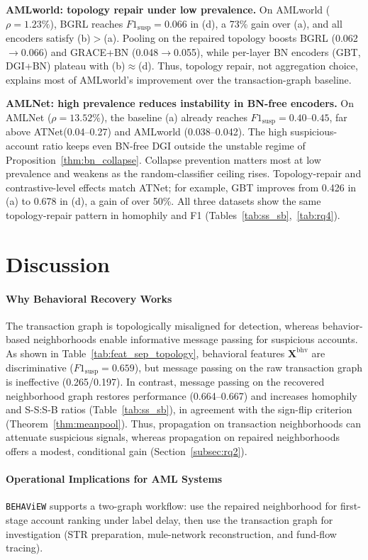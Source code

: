 \documentclass[sigconf,natbib=true,anonymous=true]{acmart}
\theoremstyle{definition}
\newcommand{\method}{\texttt{BEHAViEW}\xspace}
\newcommand{\hofinet}{ATNet\xspace} %
\begin{document}
\textbf{AMLworld: topology repair under low prevalence.} On AMLworld ($\rho{=}1.23\%$), BGRL reaches $F1_{\text{susp}}=0.066$ in (d), a 73\% gain over (a), and all encoders satisfy (b)$>$(a). Pooling on the repaired topology boosts BGRL (0.062$\to$0.066) and GRACE+BN (0.048$\to$0.055), while per-layer BN encoders (GBT, DGI+BN) plateau with (b)$\approx$(d). Thus, topology repair, not aggregation choice, explains most of AMLworld’s improvement over the transaction-graph baseline.

\textbf{AMLNet: high prevalence reduces instability in BN-free encoders.} On AMLNet ($\rho{=}13.52\%$), the baseline (a) already reaches $F1_{\text{susp}}=0.40$--$0.45$, far above \hofinet (0.04--0.27) and AMLworld (0.038--0.042). The high suspicious-account ratio keeps even BN-free DGI outside the unstable regime of Proposition~\ref{thm:bn_collapse}. Collapse prevention matters most at low prevalence and weakens as the random-classifier ceiling rises. Topology-repair and contrastive-level effects match \hofinet; for example, GBT improves from 0.426 in (a) to 0.678 in (d), a gain of over 50\%. All three datasets show the same topology-repair pattern in homophily and F1 (Tables~\ref{tab:ss_sb},~\ref{tab:rq4}).

\section{Discussion}
\paragraph{\textbf{Why Behavioral Recovery Works}}
The transaction graph is topologically misaligned for detection, whereas behavior-based neighborhoods enable informative message passing for suspicious accounts. As shown in Table~\ref{tab:feat_sep_topology}, behavioral features $\mathbf{X}^{\text{bhv}}$ are discriminative ($F1_{\text{susp}}=0.659$), but message passing on the raw transaction graph is ineffective (0.265/0.197). In contrast, message passing on the recovered neighborhood graph restores performance (0.664--0.667) and increases homophily and S-S:S-B ratios (Table~\ref{tab:ss_sb}), in agreement with the sign-flip criterion (Theorem~\ref{thm:meanpool}). Thus, propagation on transaction neighborhoods can attenuate suspicious signals, whereas propagation on repaired neighborhoods offers a modest, conditional gain (Section~\ref{subsec:rq2}).

\paragraph{\textbf{Operational Implications for AML Systems}}
\method supports a two-graph workflow: use the repaired neighborhood for first-stage account ranking under label delay, then use the transaction graph for investigation (STR preparation, mule-network reconstruction, and fund-flow tracing).
\end{document}
